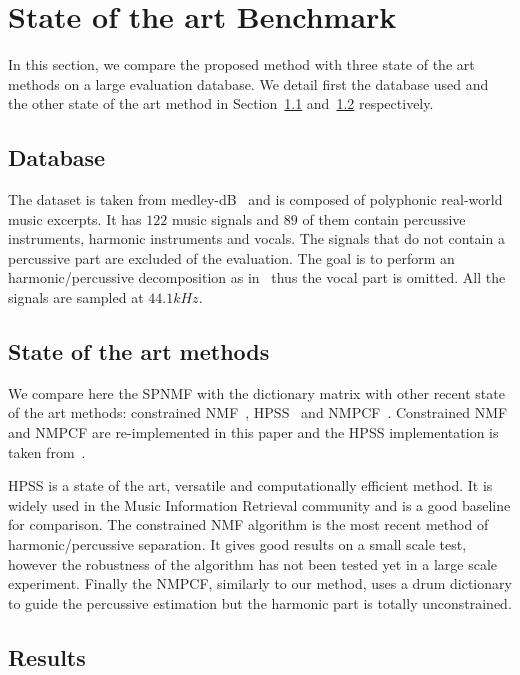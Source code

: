 
\section{State of the art Benchmark}
\label{sec:stateoftheart}

In this section, we compare the proposed method with three state of the art methods on a large evaluation database. We detail first the database used and the other state of the art method in Section~\ref{database} and~\ref{soth} respectively.  


\subsection{Database}
\label{database}

The dataset is taken from medley-dB~\cite{bittner2014medleydb} and is composed of polyphonic real-world music excerpts. It has $122$ music signals and $89$ of them contain percussive instruments, harmonic instruments and vocals. The signals that do not contain a percussive part are excluded of the evaluation. The goal is to perform an harmonic/percussive decomposition as in~\cite{canadas2014percussive} thus the vocal part is omitted. All the signals are sampled at $44.1kHz$.

\subsection{State of the art methods}
\label{soth}

We compare here the SPNMF with the dictionary matrix with other recent state of the art methods: constrained NMF~\cite{canadas2014percussive}, HPSS~\cite{fitzgerald2010harmonic} and NMPCF~\cite{kim2011nonnegative}. Constrained NMF and NMPCF are re-implemented in this paper and the HPSS implementation is taken from~\cite{DriedgerMueller14_TSMToolbox_DAFX}.

HPSS is a state of the art, versatile and computationally efficient method. It is widely used in the Music Information Retrieval community and is a good baseline for comparison. The constrained NMF algorithm is the most recent method of harmonic/percussive separation. It gives good results on a small scale test, however the robustness of the algorithm has not been tested yet in a large scale experiment. Finally the NMPCF, similarly to our method, uses a drum dictionary to guide the percussive estimation but the harmonic part is totally unconstrained. 


\subsection{Results} 
\label{subResults}

